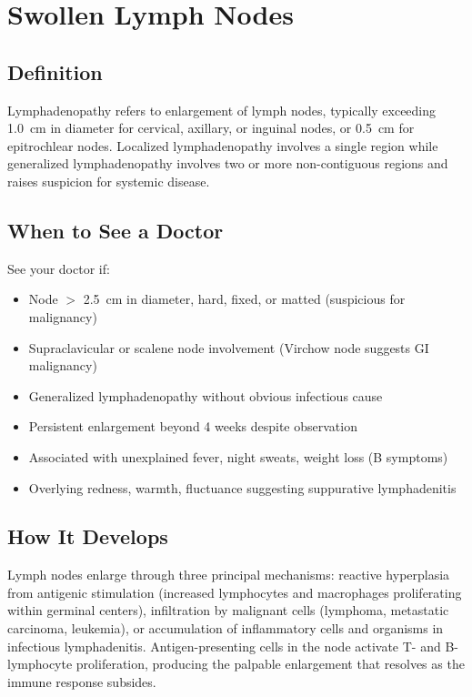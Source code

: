 \chapter{Swollen Lymph Nodes}

\section*{Definition}
Lymphadenopathy refers to enlargement of lymph nodes, typically exceeding 1.0~cm in diameter for cervical, axillary, or inguinal nodes, or 0.5~cm for epitrochlear nodes. Localized lymphadenopathy involves a single region while generalized lymphadenopathy involves two or more non-contiguous regions and raises suspicion for systemic disease.

\section*{When to See a Doctor}
See your doctor if:
\begin{itemize}
  \item Node $>$ 2.5~cm in diameter, hard, fixed, or matted (suspicious for malignancy)
  \item Supraclavicular or scalene node involvement (Virchow node suggests GI malignancy)
  \item Generalized lymphadenopathy without obvious infectious cause
  \item Persistent enlargement beyond 4 weeks despite observation
  \item Associated with unexplained fever, night sweats, weight loss (B symptoms)
  \item Overlying redness, warmth, fluctuance suggesting suppurative lymphadenitis
\end{itemize}

\section*{How It Develops}
Lymph nodes enlarge through three principal mechanisms: reactive hyperplasia from antigenic stimulation (increased lymphocytes and macrophages proliferating within germinal centers), infiltration by malignant cells (lymphoma, metastatic carcinoma, leukemia), or accumulation of inflammatory cells and organisms in infectious lymphadenitis. Antigen-presenting cells in the node activate T- and B-lymphocyte proliferation, producing the palpable enlargement that resolves as the immune response subsides.

